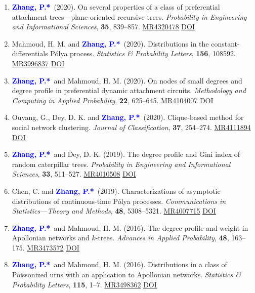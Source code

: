 \documentclass{res}
\def\MR#1{\href{http://www.ams.org/mathscinet-getitem?mr=#1}{MR#1}}
\newcommand{\PZ}{\textbf{\textcolor{blue}{Zhang, P.*}}}
\begin{document}
\begin{resume}
\begin{enumerate}
	\item \PZ\ (2020). On several properties of a 
	class of preferential attachment trees---plane-oriented 
	recursive trees. {\em Probability in Engineering and 
	Informational Sciences}, {\bf 35}, 839--857. \MR{4320478}
	\href{https://doi.org/10.1017/S0269964820000261}
	{\underline{DOI}}
	
	\item {\sc Mahmoud, H. M.} and \PZ\ (2020). 
	Distributions in the constant-differentials P\'{o}lya process. 
	{\em Statistics \& Probability Letters}, \textbf{156}, 108592. 
	\MR{3996837}
	\href{https://doi.org/10.1016/j.spl.2019.108592}
	{\underline{DOI}}
		
	\item \PZ\ and {\sc Mahmoud, H. M.} (2020). On 
	nodes of small degrees and degree profile in preferential 
	dynamic attachment circuits. {\em Methodology and Computing in 
	Applied Probability}, \textbf{22}, 625--645. \MR{4104007}
	\href{https://doi.org/10.1007/s11009-019-09726-4}
	{\underline{DOI}}

	\item {\sc Ouyang, G., Dey, D. K.} and \PZ\ (2020). 
	Clique-based method for social network clustering. {\em Journal 
	of 
	Classification}, \textbf{37}, 254--274. \MR{4111894}
	\href{https://doi.org/10.1007/s00357-019-9310-5}
	{\underline{DOI}}
	
	\item \PZ\ and {\sc Dey, D. K.} (2019). The degree 
	profile and Gini index of random caterpillar trees. {\em 
	Probability in Engineering and Informational Sciences}, 
	\textbf{33}, 511--527. \MR{4010508}
	\href{https://doi.org/10.1017/S0269964818000475}
	{\underline{DOI}}
		
	\item {\sc Chen, C.} and \PZ\ (2019). Characterizations of 
	asymptotic distributions of continuous-time P\'{o}lya processes. 
	{\em Communications in Statistics---Theory and Methods}, 
	\textbf{48}, 5308--5321. \MR{4007715}
	\href{https://doi.org/10.1080/03610926.2018.1510005}
	{\underline{DOI}}
	
	\item \PZ\ and {\sc Mahmoud, H. M.} (2016). The 
	degree profile and weight in Apollonian networks and $k$-trees. 
	\emph{Advances in Applied Probability}, \textbf{48}, 163--175. 
	\MR{3473572}
	\href{https://doi.org/10.1017/apr.2015.11}
	{\underline{DOI}}
		
	\item \PZ\ and {\sc Mahmoud, H. M.} (2016). 
	Distributions in a class of Poissonized urns with an application 
	to Apollonian networks. \emph{Statistics \& Probability 
	Letters}, {\bf 115}, 1--7. \MR{3498362}
	\href{https://doi.org/10.1016/j.spl.2016.03.023}
	{\underline{DOI}}


\end{enumerate}
\end{resume}
\end{document}
